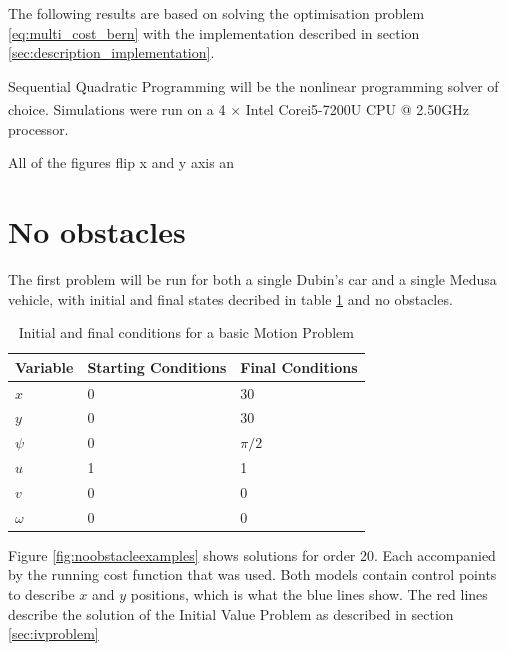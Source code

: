 \cleardoublepage
\label{chap:results}

\par The following results are based on solving the optimisation problem \eqref{eq:multi_cost_bern} with the implementation described in section \ref{sec:description_implementation}.
\par Sequential Quadratic Programming \cite{10.1007/978-0-387-35514-6_7} will be the nonlinear programming solver of choice. Simulations were run on a 4 × Intel\textsuperscript{\textcopyright} Core\texttrademark i5-7200U CPU @ 2.50GHz processor.

\par All of the figures flip x and y axis an

\section{No obstacles}

\par The first problem will be run for both a single Dubin's car and a single Medusa vehicle, with initial and final states decribed in table \ref{tab:firstproblem} and no obstacles.
\begin{table}[h!]
\begin{tabular}{|l|l|l|}
\hline
Variable & Starting Conditions & Final Conditions \\ \hline
$x$ & 0 & 30 \\
$y$ & 0 & 30 \\
$\psi$ & 0 & $\pi/2$ \\
$u$ & 1 & 1 \\
$v$ & 0 & 0 \\
$\omega$ & 0 & 0 \\
\hline
\end{tabular}
\caption{Initial and final conditions for a basic Motion Problem}
\label{tab:firstproblem}
\end{table}

\par Figure \ref{fig:noobstacleexamples} shows solutions for order 20. Each accompanied by the running cost function that was used. Both models contain control points to describe $x$ and $y$ positions, which is what the blue lines show. The red lines describe the solution of the Initial Value Problem as described in section \ref{sec:ivproblem}

